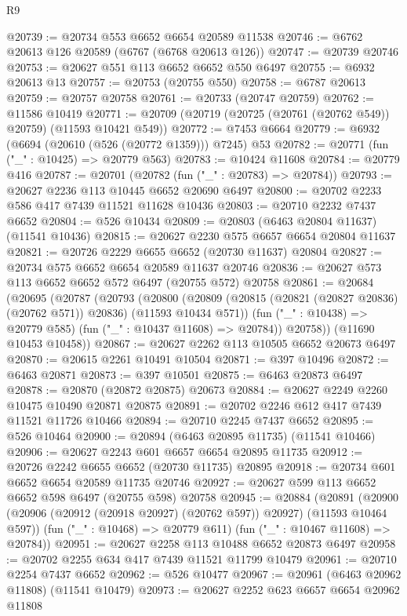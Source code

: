 \begin{lexlean}{R9}
\begin{coremodule}
@20739 := @20734 @553 @6652 @6654 @20589 @11538
@20746 := @6762 @20613 @126 @20589 (@6767 (@6768 @20613 @126))
@20747 := @20739 @20746
@20753 := @20627 @551 @113 @6652 @6652 @550 @6497
@20755 := @6932 @20613 @13
@20757 := @20753 (@20755 @550)
@20758 := @6787 @20613
@20759 := @20757 @20758
@20761 := @20733 (@20747 @20759)
@20762 := @11586 @10419
@20771 := @20709 (@20719 (@20725 (@20761 (@20762 @549)) @20759) (@11593 @10421 @549))
@20772 := @7453 @6664
@20779 := @6932 (@6694 (@20610 (@526 (@20772 @1359))) @7245) @53
@20782 := @20771 (fun ("_" : @10425) => @20779 @563)
@20783 := @10424 @11608
@20784 := @20779 @416
@20787 := @20701 (@20782 (fun ("_" : @20783) => @20784))
@20793 := @20627 @2236 @113 @10445 @6652 @20690 @6497
@20800 := @20702 @2233 @586 @417 @7439 @11521 @11628 @10436
@20803 := @20710 @2232 @7437 @6652
@20804 := @526 @10434
@20809 := @20803 (@6463 @20804 @11637) (@11541 @10436)
@20815 := @20627 @2230 @575 @6657 @6654 @20804 @11637
@20821 := @20726 @2229 @6655 @6652 (@20730 @11637) @20804
@20827 := @20734 @575 @6652 @6654 @20589 @11637 @20746
@20836 := @20627 @573 @113 @6652 @6652 @572 @6497 (@20755 @572) @20758
@20861 := @20684
    (@20695
      (@20787
        (@20793
          (@20800
            (@20809 (@20815 (@20821 (@20827 @20836) (@20762 @571)) @20836) (@11593 @10434 @571))
            (fun ("_" : @10438) => @20779 @585)
            (fun ("_" : @10437 @11608) => @20784))
          @20758))
      (@11690 @10453 @10458))
@20867 := @20627 @2262 @113 @10505 @6652 @20673 @6497
@20870 := @20615 @2261 @10491 @10504
@20871 := @397 @10496
@20872 := @6463 @20871
@20873 := @397 @10501
@20875 := @6463 @20873 @6497
@20878 := @20870 (@20872 @20875) @20673
@20884 := @20627 @2249 @2260 @10475 @10490 @20871 @20875
@20891 := @20702 @2246 @612 @417 @7439 @11521 @11726 @10466
@20894 := @20710 @2245 @7437 @6652
@20895 := @526 @10464
@20900 := @20894 (@6463 @20895 @11735) (@11541 @10466)
@20906 := @20627 @2243 @601 @6657 @6654 @20895 @11735
@20912 := @20726 @2242 @6655 @6652 (@20730 @11735) @20895
@20918 := @20734 @601 @6652 @6654 @20589 @11735 @20746
@20927 := @20627 @599 @113 @6652 @6652 @598 @6497 (@20755 @598) @20758
@20945 := @20884
    (@20891
      (@20900 (@20906 (@20912 (@20918 @20927) (@20762 @597)) @20927) (@11593 @10464 @597))
      (fun ("_" : @10468) => @20779 @611)
      (fun ("_" : @10467 @11608) => @20784))
@20951 := @20627 @2258 @113 @10488 @6652 @20873 @6497
@20958 := @20702 @2255 @634 @417 @7439 @11521 @11799 @10479
@20961 := @20710 @2254 @7437 @6652
@20962 := @526 @10477
@20967 := @20961 (@6463 @20962 @11808) (@11541 @10479)
@20973 := @20627 @2252 @623 @6657 @6654 @20962 @11808

\end{coremodule}
\end{lexlean}
